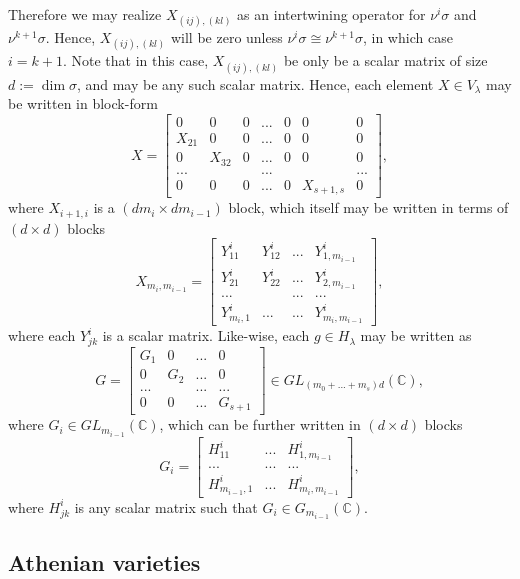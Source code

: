 \documentclass{memoir}
\newcommand{\bc}{\mathbb{C}}
\theoremstyle{definition}
\begin{document}
	Therefore we may realize $X_{(ij),(kl)}$ as an intertwining operator for $\nu^i\sigma$ and $\nu^{k+1}\sigma$.  
	Hence, $X_{(ij),(kl)}$ will be zero unless $\nu^i\sigma\cong\nu^{k+1}\sigma$, in which case $i=k+1$.  
	Note that in this case, $X_{(ij),(kl)}$ be only be a scalar matrix of size $d:=\dim\sigma$, and may be any such scalar matrix.  
	Hence, each element $X\in V_\lambda$ may be written in block-form
	$$X=\begin{bmatrix}
		0 & 0 & 0 & ... & 0 & 0 & 0 \\
		X_{21} & 0 & 0 & ... & 0 & 0 & 0 \\
		0 & X_{32} & 0 & ... & 0 & 0 & 0 \\
		... & & & ... & & & ... \\
		0 & 0 & 0 & ... & 0 & X_{s+1,s} & 0 
	\end{bmatrix},$$
	where $X_{i+1, i}$ is a $(dm_i\times dm_{i-1})$ block, which itself may be written in terms of $(d\times d)$ blocks 
	$$X_{m_i, m_{i-1}}=\begin{bmatrix}
		Y_{11}^i & Y_{12}^i & ... & Y_{1, m_{i-1}}^i\\
		Y_{21}^i & Y_{22}^i & ... & Y_{2, m_{i-1}}^i \\
		... & & ... & ...\\
		Y_{m_i, 1}^i & ... & ... & Y_{m_i, m_{i-1}}^i
	\end{bmatrix},$$
	where each $Y_{jk}^i$ is a scalar matrix.  
	Like-wise, each $g\in H_\lambda$ may be written as 
	$$G=\begin{bmatrix}
		G_1 & 0 & ... & 0 \\
		0 & G_2 & ... & 0 \\
		... & & ... & ...\\
		0 & 0 & ... & G_{s+1}
	\end{bmatrix}\in GL_{(m_0+... +m_s)d}(\bc),$$
	where $G_i\in GL_{m_{i-1}}(\bc)$, which can be further written in $(d\times d)$ blocks
	$$G_i=\begin{bmatrix}
		H_{11}^i & ... & H_{1,m_{i-1}}^i \\
		... & ... & ... \\
		H_{m_{i-1}, 1}^i & ... & H_{m_i, m_{i-1}}^i
	\end{bmatrix},$$
	where $H_{jk}^i$ is any scalar matrix such that $G_i\in G_{m_{i-1}}(\bc)$. 
	
	
	\subsection{Athenian varieties}
	
\end{document}
